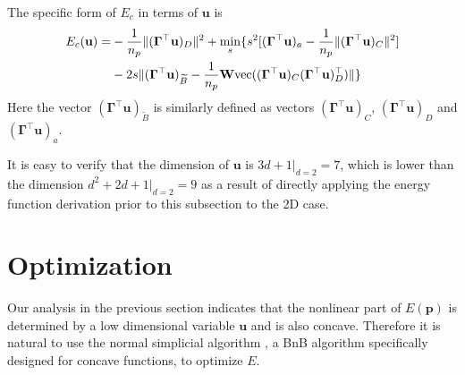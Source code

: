\documentclass[11pt,bezier,]{article}
\begin{document}
The specific form of $E_c$ in terms of  $\mathbf u$ is
\begin{align}
 E_c(\mathbf u) =& 
- \frac{1}{n_p} \|(\mathbf\Gamma^\top\mathbf u)_D \|^2  %
 + \min_{s} \{s^2 [ (\mathbf\Gamma^\top\mathbf u)_a  
- \frac{1}{n_p}    \|(\mathbf\Gamma^\top\mathbf u)_C \|^2 ]  \notag\\ 
& - 2s \|  (\mathbf\Gamma^\top\mathbf u)_{\widetilde B}  
- \frac{1}{n_p} \mathbf W \text{vec}((\mathbf\Gamma^\top\mathbf u)_C (\mathbf\Gamma^\top\mathbf u)_D^\top)  \| \} 
\end{align}
Here the vector $(\mathbf\Gamma^\top\mathbf u)_{\widetilde B}$ is similarly defined as vectors
$(\mathbf\Gamma^\top\mathbf u)_{C}$, $(\mathbf\Gamma^\top\mathbf u)_{D}$ and $(\mathbf\Gamma^\top\mathbf u)_{ a}$.

It is easy to verify that the dimension of
$\mathbf u$ is $3d+1|_{d=2}=7$,
which is lower than the dimension
$d^2+2d+1|_{d=2}=9$
as a result of directly applying the energy function derivation prior to this subsection to the 2D case.




\section{Optimization \label{sect:optimize}}





Our analysis in the previous section indicates that 
the nonlinear part of  $E(\mathbf p)$ is  determined by a low dimensional variable $\mathbf u$ and 
 is also concave.
Therefore it is natural to use the normal simplicial algorithm \cite{book_concave}, 
a BnB algorithm specifically designed for concave functions, to optimize $E$.
\end{document}
